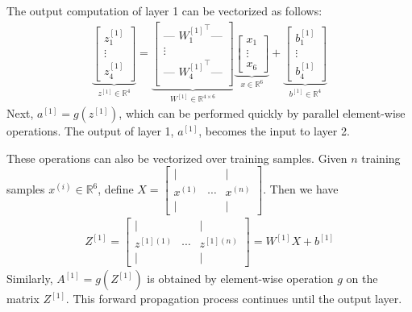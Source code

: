 \documentclass[10pt]{article}
\begin{document}
\begin{multicols}{2}
\begin{addmargin}[0.8em]{0.5em}
\begin{enumerate}[label=(\alph*)]
        The output computation of layer 1 can be vectorized as follows:
        \begin{align*}
            \underbrace{ 
            \begin{bmatrix}
            z_1^{[1]} \\ \vdots \\ z_4^{[1]}
            \end{bmatrix} 
            }_{
            z^{[1]} \in \mathbb{R}^{4}
            }
            =
            \underbrace{ 
            \begin{bmatrix}
            \text{--- }  {W_1^{[1]}}^\top  \text{---} \\
            \vdots  \\
            \text{--- }  {W_4^{[1]}}^\top  \text{---} \\
            \end{bmatrix} 
            }_{
            W^{[1]} \in \mathbb{R}^{4 \times 6}
            }    
            \underbrace{ 
            \begin{bmatrix}
            x_1 \\ \vdots \\ x_6
            \end{bmatrix} 
            }_{
            x \in \mathbb{R}^{6}
            }           
            +
            \underbrace{ 
            \begin{bmatrix}
            b_1^{[1]} \\ \vdots \\ b_4^{[1]}
            \end{bmatrix} 
            }_{
            b^{[1]} \in \mathbb{R}^{4}
            }            
        \end{align*}
        Next, $a^{[1]} = g(z^{[1]})$, which can be performed quickly by parallel element-wise operations. The output of layer 1, $a^{[1]}$, becomes the input to layer 2.
        
        These operations can also be vectorized over training samples. Given $n$ training samples $x^{(i)} \in \mathbb{R}^6$, define
        $
            X = 
            \begin{bmatrix} 
            | & & | \\
            x^{(1)} & \cdots & x^{(n)} \\
            | & & |
            \end{bmatrix}
        $.
        Then we have
        \begin{align*}
            Z^{[1]} =
            \begin{bmatrix} 
            | & & | \\
            z^{[1](1)} & \cdots & z^{[1](n)} \\
            | & & |
            \end{bmatrix}
            = W^{[1]} X + b^{[1]}
        \end{align*}      
        Similarly, $A^{[1]} = g(Z^{[1]})$ is obtained by element-wise operation $g$ on the matrix $Z^{[1]}$. This forward propagation process continues until the output layer. 
        

\end{enumerate}
\end{addmargin}
\end{multicols}
\end{document}

